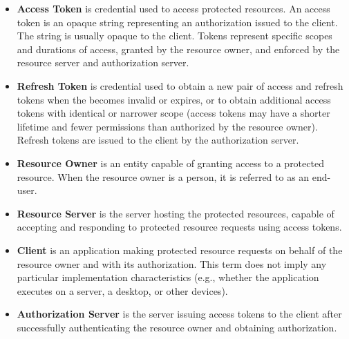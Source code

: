 \begin{itemize}
    \item \textbf{Access Token} is credential used to access protected resources.
    An access token is an opaque string representing an authorization issued to the client.
    The string is usually opaque to the client.
    Tokens represent specific scopes and
    durations of access, granted by the resource owner, and enforced by the resource server and authorization server.
    \item \textbf{Refresh Token} is credential used to obtain a new pair of access and refresh tokens when the becomes
    invalid or expires, or to obtain additional access tokens with identical or narrower scope (access tokens may have a shorter
    lifetime and fewer permissions than authorized by the resource owner).
    Refresh tokens are issued to the client by the authorization server.
    \item \textbf{Resource Owner} is an entity capable of granting access to a protected resource.
    When the resource owner is a person, it is referred to as an end-user.
    \item \textbf{Resource Server} is the server hosting the protected resources, capable of accepting and responding to protected
    resource requests using access tokens.
    \item \textbf{Client} is an application making protected resource requests on behalf of the resource owner and with its authorization.
    This term does not imply any particular implementation characteristics (e.g., whether the application executes on a server,
    a desktop, or other devices).
    \item \textbf{Authorization Server} is the server issuing access tokens to the client after successfully authenticating the resource owner
    and obtaining authorization.
\end{itemize}
